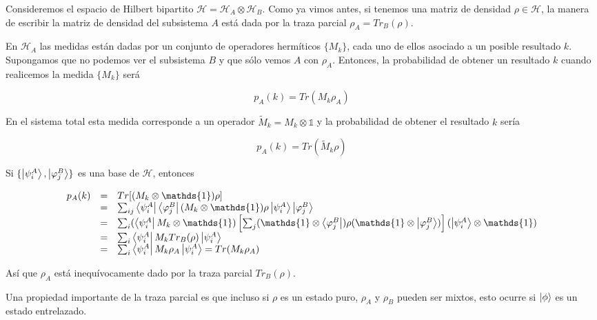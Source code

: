 Consideremos el espacio de Hilbert bipartito $\mathcal{H} = \mathcal{H}_A \otimes \mathcal{H}_B$. Como ya vimos antes, si tenemos una matriz de densidad $\rho \in \mathcal{H}$, la manera de escribir la matriz de densidad del subsistema $A$ está dada por la traza parcial $\rho_A = Tr_B(\rho)$.

En $\mathcal{H}_A$ las medidas están dadas por un conjunto de operadores hermíticos $\{M_k\}$, cada uno de ellos asociado a un posible resultado $k$. Supongamos que no podemos ver el subsistema $B$ y que sólo vemos $A$ con $\rho_A$. Entonces, la probabilidad de obtener un resultado $k$ cuando realicemos la medida $\{M_k\}$ será

\begin{equation}
    p_A(k) = Tr(M_k \rho_A)
\end{equation}

En el sistema total esta medida corresponde a un operador $\tilde{M}_k = M_k \otimes \mathds{1}$ y la probabilidad de obtener el resultado $k$ sería

\begin{equation}
    p_A(k) = Tr(\tilde{M}_k \rho)
\end{equation}

Si $\{\ket{\psi_i^A}, \ket{\varphi_j^B}\}$ es una base de $\mathcal{H}$, entonces

\begin{equation}
    \begin{array}{r c l}
        p_A(k)
        &=& Tr[(M_k \otimes \mathds{1}) \rho] \\
        &=& \sum_{ij} \bra{\psi_i^A} \bra{\varphi_j^B} (M_k \otimes \mathds{1}) \rho \ket{\psi_i^A} \ket{\varphi_j^B} \\
        &=& \sum_i (\bra{\psi_i^A} M_k \otimes \mathds{1}) \left[\sum_j (\mathds{1} \otimes \bra{\varphi_j^B}) \rho (\mathds{1} \otimes \ket{\varphi_j^B})\right] (\ket{\psi_i^A} \otimes \mathds{1}) \\
        &=& \sum_i \bra{\psi_i^A} M_k Tr_B(\rho) \ket{\psi_i^A} \\
        &=& \sum_i \bra{\psi_i^A} M_k \rho_A \ket{\psi_i^A} = Tr(M_k \rho_A)
    \end{array}
\end{equation}

Así que $\rho_A$ está inequívocamente dado por la traza parcial $Tr_B(\rho)$.

Una propiedad importante de la traza parcial es que incluso si $\rho$ es un estado puro, $\rho_A$ y $\rho_B$ pueden ser mixtos, esto ocurre si $\ket{\phi}$ es un estado entrelazado.

